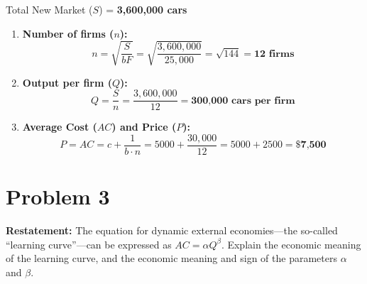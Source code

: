 \documentclass[11pt, letterpaper]{article}
\begin{document}




\noindent Total New Market ($S$) = \textbf{3,600,000 cars}

\begin{enumerate}[label=\textbf{\alph*.}]
  \item \textbf{Number of firms ($n$):}
    $$n = \sqrt{\frac{S}{bF}} = \sqrt{\frac{3,600,000}{25,000}} = \sqrt{144} = \textbf{12 firms}$$

  \item \textbf{Output per firm ($Q$):}
    $$Q = \frac{S}{n} = \frac{3,600,000}{12} = \textbf{300,000 cars per firm}$$

  \item \textbf{Average Cost ($AC$) and Price ($P$):}
    $$P = AC = c + \frac{1}{b \cdot n} = 5000 + \frac{30,000}{12} = 5000 + 2500 = \textbf{\$7,500}$$
\end{enumerate}

\vspace{1em}
\section*{Problem 3}

\textbf{Restatement:} The equation for dynamic external economies---the so-called ``learning curve''---can be expressed as $AC = \alpha Q^\beta$. Explain the economic meaning of the learning curve, and the economic meaning and sign of the parameters $\alpha$ and $\beta$.
\end{document}
